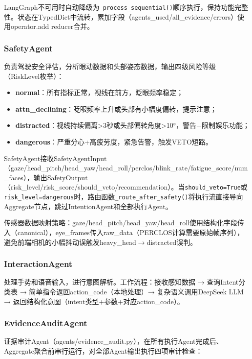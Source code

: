 \documentclass[a4paper]{article}
\begin{document}
LangGraph不可用时自动降级为\texttt{\_process\_sequential()}顺序执行，保持功能完整性。状态在TypedDict中流转，累加字段（agents\_used/all\_evidence/errors）使用operator.add reducer合并。

\subsubsection{SafetyAgent}

负责驾驶安全评估，分析眼动数据和头部姿态数据，输出四级风险等级（RiskLevel枚举）：

\begin{itemize}
    \item \textbf{normal}：所有指标正常，视线在前方，眨眼频率稳定；
    \item \textbf{attn\_declining}：眨眼频率上升或头部有小幅度偏转，提示注意；
    \item \textbf{distracted}：视线持续偏离>3秒或头部偏转角度>10°，警告+限制娱乐功能；
    \item \textbf{dangerous}：严重分心+高疲劳度，紧急告警，触发VETO短路。
\end{itemize}

SafetyAgent接收SafetyAgentInput（gaze/head\_pitch/head\_yaw/head\_roll/perclos/blink\_rate/fatigue\_score/num\_faces），输出SafetyOutput（risk\_level/risk\_score/should\_veto/recommendation）。当\texttt{should\_veto=True}或\texttt{risk\_level=dangerous}时，路由函数\texttt{\_route\_after\_safety()}将执行流直接导向Aggregate节点，跳过IntentionAgent和全部执行Agent。

传感器数据映射策略：gaze/head\_pitch/head\_yaw/head\_roll使用结构化字段传入（canonical），eye\_frames传入raw\_data（PERCLOS计算需要原始帧序列），避免前端相机的小幅抖动误触发heavy\_head$\rightarrow$distracted误判。

\subsubsection{InteractionAgent}

处理手势和语音输入，进行意图解析。工作流程：接收感知数据 → 查询Intent分类表 → 简单指令返回action\_code（本地处理）→ 复杂语义调用DeepSeek LLM → 返回结构化意图（intent类型+参数+对应action\_code）。

\subsubsection{EvidenceAuditAgent}

证据审计Agent（agents/evidence\_audit.py），在所有执行Agent完成后、Aggregate聚合前串行运行，对全部Agent输出执行四项审计检查：
\end{document}
